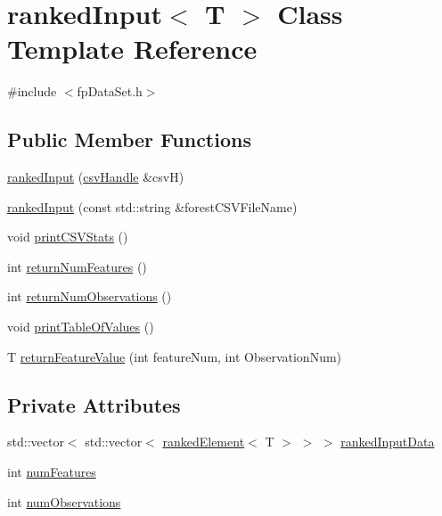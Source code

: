 \hypertarget{classrankedInput}{}\section{ranked\+Input$<$ T $>$ Class Template Reference}
\label{classrankedInput}


{\ttfamily \#include $<$fp\+Data\+Set.\+h$>$}

\subsection*{Public Member Functions}
\begin{DoxyCompactItemize}
\item 
\hyperlink{classrankedInput_a68fd13cc8d6784da58717a85f811fbf3}{ranked\+Input} (\hyperlink{classcsvHandle}{csv\+Handle} \&csvH)
\item 
\hyperlink{classrankedInput_a5b881de847a501b5c6857f6f3ade26a2}{ranked\+Input} (const std\+::string \&forest\+C\+S\+V\+File\+Name)
\item 
void \hyperlink{classrankedInput_a5a63105754b648c5047f887f5ca9b3b6}{print\+C\+S\+V\+Stats} ()
\item 
int \hyperlink{classrankedInput_a2386d6816fca791a04f13fe2312307be}{return\+Num\+Features} ()
\item 
int \hyperlink{classrankedInput_a0760d6140433f4935f57f0d2cdabeef9}{return\+Num\+Observations} ()
\item 
void \hyperlink{classrankedInput_a72fc3f9bf4d358babdf84c96617417f3}{print\+Table\+Of\+Values} ()
\item 
T \hyperlink{classrankedInput_a691f0acc7f92a6e8051e85e585556f06}{return\+Feature\+Value} (int feature\+Num, int Observation\+Num)
\end{DoxyCompactItemize}
\subsection*{Private Attributes}
\begin{DoxyCompactItemize}
\item 
std\+::vector$<$ std\+::vector$<$ \hyperlink{classrankedElement}{ranked\+Element}$<$ T $>$ $>$ $>$ \hyperlink{classrankedInput_a5450364c3f258e15f28248a8a3c93ffa}{ranked\+Input\+Data}
\item 
int \hyperlink{classrankedInput_ad86e2ad8f4044697450ddfdb15aa10a9}{num\+Features}
\item 
int \hyperlink{classrankedInput_a7b0e6ebcf6fa2fcd0b08918e3b3020be}{num\+Observations}
\end{DoxyCompactItemize}


